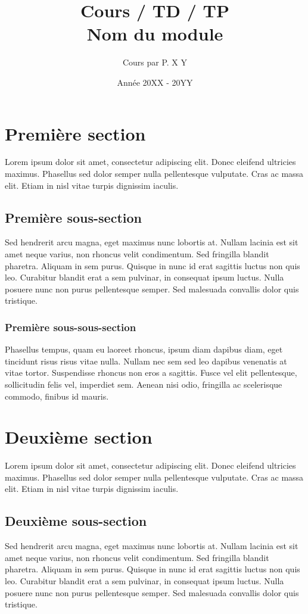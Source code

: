 \documentclass[11pt, a4paper, french]{article}
\title  {\textbf{Cours / TD / TP}\\Nom du module    }
\author {Cours par P\up{r}. X Y                     }
\date   {Année 20XX - 20YY                          }
\begin{document}
\maketitle

\tableofcontents

\newpage

\section{Première section}
Lorem ipsum dolor sit amet, consectetur adipiscing elit. Donec eleifend ultricies maximus. Phasellus sed dolor semper nulla pellentesque vulputate. Cras ac massa elit. Etiam in nisl vitae turpis dignissim iaculis.

\subsection{Première sous-section}
Sed hendrerit arcu magna, eget maximus nunc lobortis at. Nullam lacinia est sit amet neque varius, non rhoncus velit condimentum. Sed fringilla blandit pharetra. Aliquam in sem purus. Quisque in nunc id erat sagittis luctus non quis leo. Curabitur blandit erat a sem pulvinar, in consequat ipsum luctus. Nulla posuere nunc non purus pellentesque semper. Sed malesuada convallis dolor quis tristique. 

\subsubsection{Première sous-sous-section}
Phasellus tempus, quam eu laoreet rhoncus, ipsum diam dapibus diam, eget tincidunt risus risus vitae nulla. Nullam nec sem sed leo dapibus venenatis at vitae tortor. Suspendisse rhoncus non eros a sagittis. Fusce vel elit pellentesque, sollicitudin felis vel, imperdiet sem. Aenean nisi odio, fringilla ac scelerisque commodo, finibus id mauris.

\section{Deuxième section}
Lorem ipsum dolor sit amet, consectetur adipiscing elit. Donec eleifend ultricies maximus. Phasellus sed dolor semper nulla pellentesque vulputate. Cras ac massa elit. Etiam in nisl vitae turpis dignissim iaculis.

\subsection{Deuxième sous-section}
Sed hendrerit arcu magna, eget maximus nunc lobortis at. Nullam lacinia est sit amet neque varius, non rhoncus velit condimentum. Sed fringilla blandit pharetra. Aliquam in sem purus. Quisque in nunc id erat sagittis luctus non quis leo. Curabitur blandit erat a sem pulvinar, in consequat ipsum luctus. Nulla posuere nunc non purus pellentesque semper. Sed malesuada convallis dolor quis tristique. 
\end{document}
